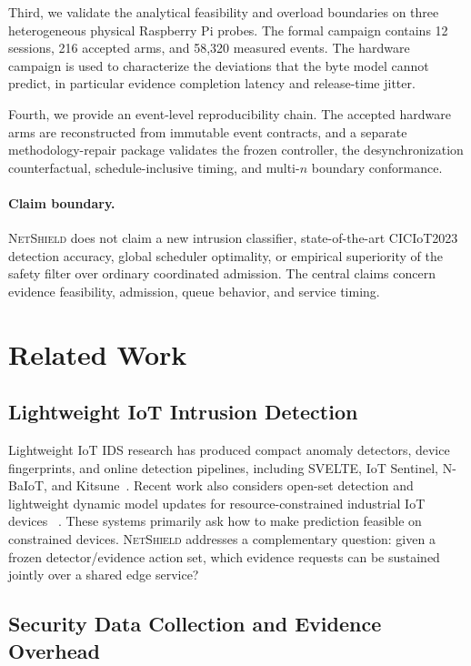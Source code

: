 \documentclass[10pt,journal]{IEEEtran}
\newcommand{\NetShield}{\textsc{NetShield}}
\begin{document}
Third, we validate the analytical feasibility and overload boundaries
on three heterogeneous physical Raspberry Pi probes. The formal
campaign contains 12 sessions, 216 accepted arms, and 58,320 measured
events. The hardware campaign is used to characterize the deviations
that the byte model cannot predict, in particular evidence completion
latency and release-time jitter.

Fourth, we provide an event-level reproducibility chain. The accepted
hardware arms are reconstructed from immutable event contracts, and a
separate methodology-repair package validates the frozen controller,
the desynchronization counterfactual, schedule-inclusive timing, and
multi-$n$ boundary conformance.

\paragraph{Claim boundary.}
\NetShield{} does not claim a new intrusion classifier, state-of-the-art
CICIoT2023 detection accuracy, global scheduler optimality, or empirical
superiority of the safety filter over ordinary coordinated admission.
The central claims concern evidence feasibility, admission, queue
behavior, and service timing.

\section{Related Work}
\label{sec:related}

\subsection{Lightweight IoT Intrusion Detection}

Lightweight IoT IDS research has produced compact anomaly detectors,
device fingerprints, and online detection pipelines, including SVELTE,
IoT Sentinel, N-BaIoT, and Kitsune~\cite{raza2013svelte,
miettinen2017iotsentinel,meidan2018nbaiot,mirsky2018kitsune}.
Recent work also considers open-set detection and lightweight dynamic
model updates for resource-constrained industrial IoT devices
~\cite{yang2025openset}.
These systems primarily ask how to make prediction feasible on
constrained devices. \NetShield{} addresses a complementary question:
given a frozen detector/evidence action set, which evidence requests can
be sustained jointly over a shared edge service?

\subsection{Security Data Collection and Evidence Overhead}
\end{document}
